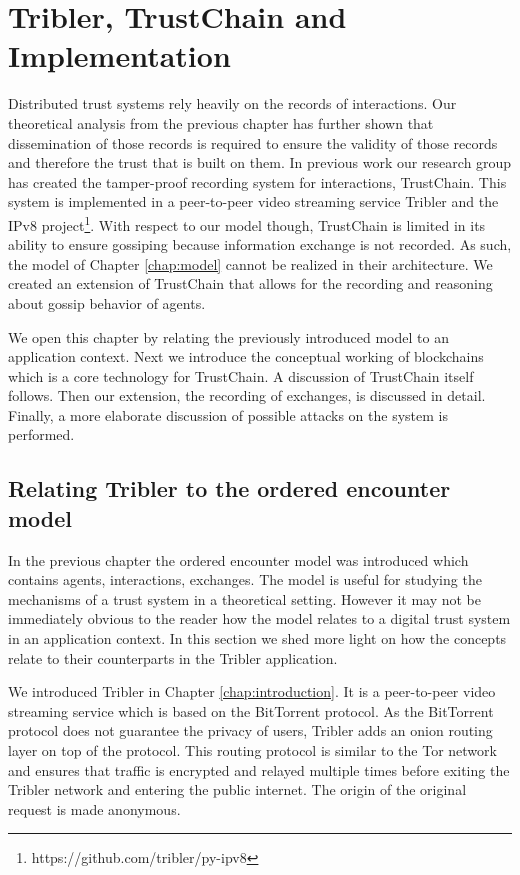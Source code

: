 \chapter{Tribler, TrustChain and Implementation}
\label{chap:implementation}

Distributed trust systems rely heavily on the records of interactions. Our theoretical analysis from
the previous chapter has further shown that dissemination of those records is required to ensure the
validity of those records and therefore the trust that is built on them. In previous work our 
research group has created the tamper-proof recording system for interactions, TrustChain. This system is 
implemented in a peer-to-peer video streaming service Tribler and the IPv8 project\footnote{https://github.com/tribler/py-ipv8}.
With respect to our model though, TrustChain is limited in its ability to ensure gossiping because information
exchange is not recorded.
As such, the model of Chapter \ref{chap:model}
cannot be realized in their architecture. We created an extension of TrustChain that allows for the 
recording and reasoning about gossip behavior of agents.

We open this chapter by relating the previously introduced model to an application context. Next we
introduce the conceptual working of blockchains which is a core technology for TrustChain. A discussion of
TrustChain itself follows. Then our extension, the recording of exchanges, is discussed in detail. 
Finally, a more elaborate discussion of possible attacks on the system is performed.

\section{Relating Tribler to the ordered encounter model}
In the previous chapter the ordered encounter model was introduced which contains agents, interactions,
exchanges. The model is useful for studying the mechanisms of a trust system in a theoretical 
setting. However it may not be immediately obvious to the reader how the model relates to a digital
trust system in an application context. In this section we shed more light on how the concepts 
relate to their counterparts in the Tribler application.

We introduced Tribler in Chapter \ref{chap:introduction}. It is a peer-to-peer video streaming 
service which is based on the BitTorrent protocol. As the BitTorrent protocol does not guarantee the
privacy of users, Tribler adds an onion routing layer on top of the protocol. This routing protocol 
is similar to the Tor network and ensures that traffic is encrypted and relayed multiple times before exiting the
Tribler network and entering the public internet. The origin of the original request is made anonymous.

